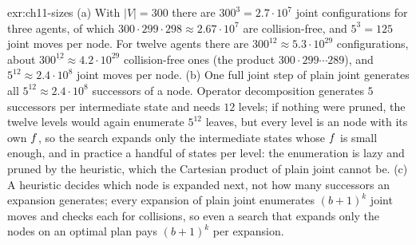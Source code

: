 
\begin{solution}{exr:ch11-sizes}
(a) With $|V| = 300$ there are $300^3 = 2.7 \cdot 10^7$ joint configurations for three agents, of which $300 \cdot 299 \cdot 298 \approx 2.67 \cdot 10^7$ are collision-free, and $5^3 = 125$ joint moves per node. For twelve agents there are $300^{12} \approx 5.3 \cdot 10^{29}$ configurations, about $300^{\underline{12}} \approx 4.2 \cdot 10^{29}$ collision-free ones (the product $300 \cdot 299 \cdots 289$), and $5^{12} \approx 2.4 \cdot 10^8$ joint moves per node. (b) One full joint step of plain joint \astar generates all $5^{12} \approx 2.4 \cdot 10^8$ successors of a node. Operator decomposition generates $5$ successors per intermediate state and needs $12$ levels; if nothing were pruned, the twelve levels would again enumerate $5^{12}$ leaves, but every level is an \astar node with its own $f$, so the search expands only the intermediate states whose $f$ is small enough, and in practice a handful of states per level: the enumeration is lazy and pruned by the heuristic, which the Cartesian product of plain joint \astar cannot be. (c) A heuristic decides which node is expanded next, not how many successors an expansion generates; every expansion of plain joint \astar enumerates $(b+1)^k$ joint moves and checks each for collisions, so even a search that expands only the nodes on an optimal plan pays $(b+1)^k$ per expansion.
\end{solution}

